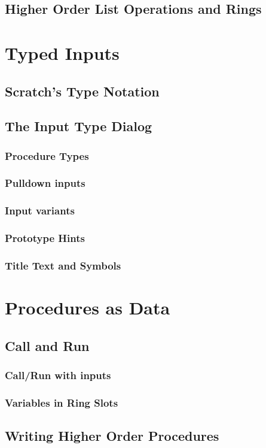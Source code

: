 \documentclass[a4paper]{report}
\begin{document}
\section{Higher Order List Operations and Rings}
\chapter{Typed Inputs}
\section{Scratch's Type Notation}
\section{The \Snap{} Input Type Dialog}
\subsection{Procedure Types}
\subsection{Pulldown inputs}
\subsection{Input variants}
\subsection{Prototype Hints}
\subsection{Title Text and Symbols}
\chapter{Procedures as Data}
\section{Call and Run}
\subsection{Call/Run with inputs}
\subsection{Variables in Ring Slots}
\section{Writing Higher Order Procedures}
\end{document}
